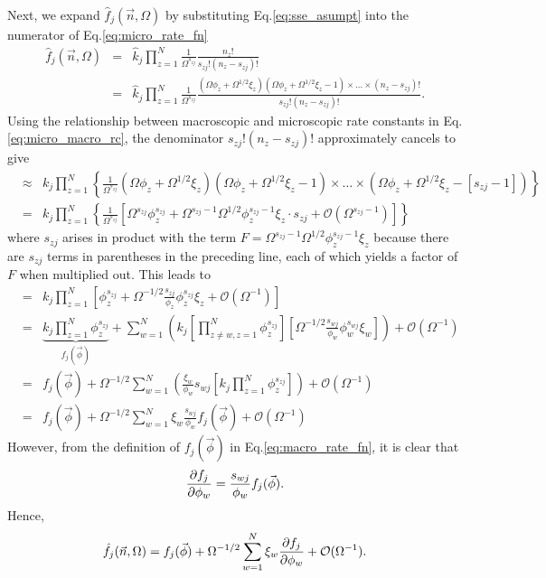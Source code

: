 \documentclass[10pt,letterpaper]{article}
\begin{document}
Next, we expand $\hat{f}_j(\vec{n},\Omega)$ by substituting Eq.\eqref{eq:sse_asumpt} into the numerator of Eq.\eqref{eq:micro_rate_fn} 
\begin{eqnarray}
\hat{f}_j(\vec{n},\Omega) &=& \hat{k}_j \prod_{z=1}^N \frac{1}{\Omega^{s_{zj}}} \frac{n_z!}{s_{zj}!(n_z-s_{zj})!} \nonumber \\
&=& \hat{k}_j \prod_{z=1}^N \frac{1}{\Omega^{s_{zj}}} \frac{(\Omega\phi_z + \Omega^{1/2}\xi_z)(\Omega\phi_z + \Omega^{1/2}\xi_z-1)\times\dots\times(n_z-s_{zj})!}{s_{zj}!(n_z-s_{zj})!}. 
\end{eqnarray}
Using the relationship between macroscopic and microscopic rate constants in Eq.\eqref{eq:micro_macro_rc}, the denominator $s_{zj}!(n_z-s_{zj})!$ approximately cancels to give
\begin{eqnarray}
&\approx& k_j \prod_{z=1}^N \left\{ \frac{1}{\Omega^{s_{zj}}} (\Omega\phi_z + \Omega^{1/2}\xi_z)(\Omega\phi_z + \Omega^{1/2}\xi_z-1)\times\dots\times(\Omega\phi_z +\Omega^{1/2}\xi_z-[s_{zj} - 1]) \right\} \nonumber \\
&=& k_j \prod_{z=1}^N \left\{\frac{1}{\Omega^{s_{zj}}} \left[ \Omega^{s_{zj}}\phi_z^{s_{zj}} + \Omega^{s_{zj}-1}\Omega^{1/2}\phi_z^{s_{zj}-1}\xi_z \cdot s_{zj} + \mathcal{O}(\Omega^{s_{zj}-1})\right] \right\}
\end{eqnarray}
where $s_{zj}$ arises in product with the term $F = \Omega^{s_{zj}-1}\Omega^{1/2}\phi_z^{s_{zj}-1}\xi_z$ because there are $s_{zj}$ terms in parentheses in the preceding line, each of which yields a factor of $F$ when multiplied out. This leads to 
\begin{eqnarray}
&=& k_j \prod_{z=1}^N  \left[ \phi_z^{s_{zj}} + \Omega^{-1/2}\frac{s_{zj}}{\phi_z}\phi_z^{s_{zj}}\xi_z + \mathcal{O}(\Omega^{-1})\right] \nonumber \\
&=& \underbrace{k_j \prod_{z=1}^N \phi_z^{s_{zj}}}_{f_j(\vec{\phi})} + \sum_{w=1}^N\left(k_j \left[\prod_{z\neq w, z=1}^N \phi_z^{s_{zj}} \right]\left[\Omega^{-1/2}\frac{s_{wj}}{\phi_w} \phi_w^{s_{wj}}  \xi_w \right]\right) + \mathcal{O}(\Omega^{-1}) \nonumber \\
&=& f_j(\vec{\phi}) + \Omega^{-1/2}\sum_{w=1}^N \left(\frac{\xi_w}{\phi_w} s_{wj} \left[ k_j \prod_{z=1}^N \phi_z^{s_{zj}} \right] \right) + \mathcal{O}(\Omega^{-1})\nonumber \\
&=& f_j(\vec{\phi}) + \Omega^{-1/2}\sum_{w=1}^N \xi_w \frac{s_{wj}}{\phi_w}  f_j(\vec{\phi}) + \mathcal{O}(\Omega^{-1})
\end{eqnarray}
However, from the definition of $f_j(\vec{\phi})$ in Eq.\eqref{eq:macro_rate_fn}, it is clear that
\begin{equation}
\frac{\partial f_j}{\partial\phi_w} = \frac{s_{wj}}{\phi_w}f_j(\vec{\phi}).
\end{equation}
Hence,
\begin{equation}
\hat{f}_j(\vec{n},\Omega) = f_j(\vec{\phi}) + \Omega^{-1/2}\sum_{w=1}^N \xi_w \frac{\partial f_j}{\partial\phi_w} + \mathcal{O}(\Omega^{-1}). \label{eq:exp_macro_rate_fn}
\end{equation}
\end{document}
